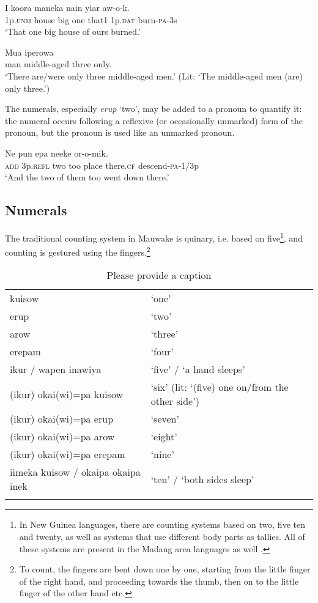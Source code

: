 \ea%
\label{ex:3:x87}
\gll I koora maneka  nain yiar aw-o-k. \\
1p.\textsc{unm} house big one that1 1p.\textsc{dat} burn-\textsc{pa}-3s\\
\glt`That one big house of ours burned.'
\z

\ea%
\label{ex:3:x442}
\gll Mua iperowa   \\
man middle-aged three only.\\
\glt`There are/were only three middle-aged men.' (Lit: `The middle-aged men (are) only three.') 
\z

The numerals, especially \textit{erup} `two', may be added to a pronoun to quantify it: the numeral occurs following a reflexive (or occasionally unmarked) form of the pronoun, but the pronoun is used like an unmarked pronoun.

\ea%
\label{ex:3:x89}
\gll Ne   pun epa neeke or-o-mik. \\
\textsc{add} 3p.\textsc{refl} two too place there.\textsc{cf} descend-\textsc{pa}-1/3p\\
\glt`And the two of them too went down there.'
\z

\subsection{Numerals}\label{sec:3:y:x}
{}
The traditional counting system in Mauwake is quinary, i.e. based on five\footnote{In New Guinea languages, there are counting systems based on two, five ten and twenty, as well as systems that use different body parts as tallies. All of these systems are present in the Madang area languages as well \citep{Lean1991}.}, and counting is gestured using the fingers.\footnote{To count, the fingers are bent down one by one, starting from the little finger of the right hand, and proceeding towards the thumb, then on to the little finger of the other hand etc.} 

\begin{table}
\caption{Please provide a caption}
\label{} 
\begin{tabular}{ll}
\mytoprule
kuisow &`one'\\
erup &`two'\\
arow &`three'\\
erepam &`four'\\
ikur / wapen inawiya &`five' / `a hand sleeps'\\
(ikur) okai(wi)=pa kuisow &`six' (lit: `(five) one on/from the other side')\\
(ikur) okai(wi)=pa erup &`seven'\\
(ikur) okai(wi)=pa arow &`eight'\\
(ikur) okai(wi)=pa erepam &`nine'\\
iimeka kuisow / okaipa okaipa inek &`ten' / `both sides sleep'\\
\mybottomrule
\end{tabular}
\end{table}


